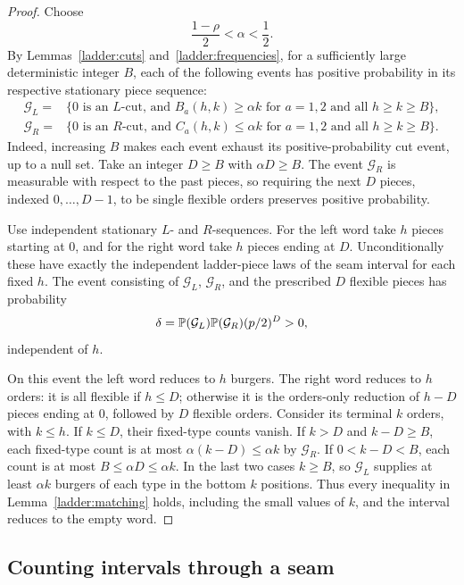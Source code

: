 \begin{proof}
Choose
\[
 \frac{1-\rho}{2}<\alpha<\frac12.
\]
By Lemmas~\ref{ladder:cuts} and~\ref{ladder:frequencies}, for a sufficiently
large deterministic integer $B$, each of the following events has positive
probability in its respective stationary piece sequence:
\begin{align*}
 \mathcal G_L={}&\{0\text{ is an }L\text{-cut, and }
 B_a(h,k)\ge\alpha k
 \text{ for }a=1,2\text{ and all }h\ge k\ge B\},\\
 \mathcal G_R={}&\{0\text{ is an }R\text{-cut, and }
 C_a(h,k)\le\alpha k
 \text{ for }a=1,2\text{ and all }h\ge k\ge B\}.
\end{align*}
Indeed, increasing $B$ makes each event exhaust its positive-probability
cut event, up to a null set.
Take an integer $D\ge B$ with $\alpha D\ge B$.
The event $\mathcal G_R$ is measurable with respect to the past pieces,
so requiring the next $D$ pieces, indexed $0,\ldots,D-1$, to be single
flexible orders preserves positive probability.

Use independent stationary $L$- and $R$-sequences.
For the left word take $h$ pieces starting at $0$, and for the right word
take $h$ pieces ending at $D$.
Unconditionally these have exactly the independent ladder-piece laws
of the seam interval for each fixed $h$.
The event consisting of $\mathcal G_L$, $\mathcal G_R$, and the prescribed
$D$ flexible pieces has probability
\[
 \delta=\P(\mathcal G_L)\P(\mathcal G_R)(p/2)^D>0,
\]
independent of $h$.

On this event the left word reduces to $h$ burgers.
The right word reduces to $h$ orders: it is all flexible if $h\le D$;
otherwise it is the orders-only reduction of $h-D$ pieces ending at $0$,
followed by $D$ flexible orders.
Consider its terminal $k$ orders, with $k\le h$.
If $k\le D$, their fixed-type counts vanish.
If $k>D$ and $k-D\ge B$, each fixed-type count is at most
$\alpha(k-D)\le\alpha k$ by $\mathcal G_R$.
If $0<k-D<B$, each count is at most $B\le\alpha D\le\alpha k$.
In the last two cases $k\ge B$, so $\mathcal G_L$ supplies at least
$\alpha k$ burgers of each type in the bottom $k$ positions.
Thus every inequality in Lemma~\ref{ladder:matching} holds, including
the small values of $k$, and the interval reduces to the empty word.
\end{proof}

\subsection{Counting intervals through a seam}


